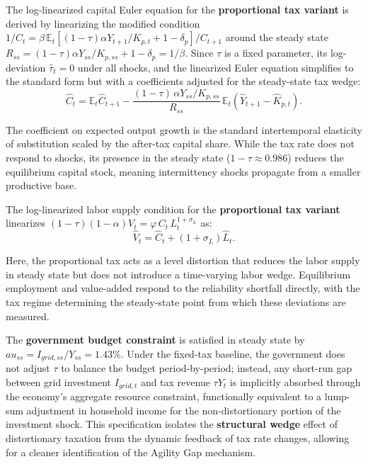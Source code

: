 	The log-linearized capital Euler equation for the \textbf{proportional tax variant} is derived by linearizing the modified condition $1/C_t = \beta\,\mathbb{E}_t[(1-\tau)\alpha Y_{t+1}/K_{p,t} + 1 - \delta_p]/C_{t+1}$ around the steady state $R_{ss} = (1-\tau)\alpha Y_{ss}/K_{p,ss} + 1 - \delta_p = 1/\beta$. Since $\tau$ is a fixed parameter, its log-deviation $\hat{\tau}_t = 0$ under all shocks, and the linearized Euler equation simplifies to the standard form but with a coefficients adjusted for the steady-state tax wedge:
	\begin{equation}
		\hat{C}_t = \mathbb{E}_t \hat{C}_{t+1}
		- \frac{(1-\tau)\,\alpha Y_{ss}/K_{p,ss}}{R_{ss}}\, \mathbb{E}_t \!\left(\hat{Y}_{t+1} - \hat{K}_{p,t}\right)
		\label{eq:euler_lin}.
	\end{equation}
	
	The coefficient on expected output growth is the standard intertemporal elasticity of substitution scaled by the after-tax capital share. While the tax rate does not respond to shocks, its presence in the steady state ($1-\tau \approx 0.986$) reduces the equilibrium capital stock, meaning intermittency shocks propagate from a smaller productive base.
	
	The log-linearized labor supply condition for the \textbf{proportional tax variant} linearizes $(1-\tau)(1-\alpha)V_t = \varphi\,C_t\,L_t^{1+\sigma_L}$ as:
	\begin{equation}
		\hat{V}_t = \hat{C}_t + (1+\sigma_L)\hat{L}_t
		\label{eq:labor_lin}.
	\end{equation}
	
	Here, the proportional tax acts as a level distortion that reduces the labor supply in steady state but does not introduce a time-varying labor wedge. Equilibrium employment and value-added respond to the reliability shortfall directly, with the tax regime determining the steady-state point from which these deviations are measured.
	
	The \textbf{government budget constraint} is satisfied in steady state by $	au_{ss} = I_{grid,ss}/Y_{ss} = 1.43\%$. Under the fixed-tax baseline, the government does not adjust $\tau$ to balance the budget period-by-period; instead, any short-run gap between grid investment $I_{grid,t}$ and tax revenue $\tau Y_t$ is implicitly absorbed through the economy's aggregate resource constraint, functionally equivalent to a lump-sum adjustment in household income for the non-distortionary portion of the investment shock. This specification isolates the \textbf{structural wedge} effect of distortionary taxation from the dynamic feedback of tax rate changes, allowing for a cleaner identification of the Agility Gap mechanism.
	
